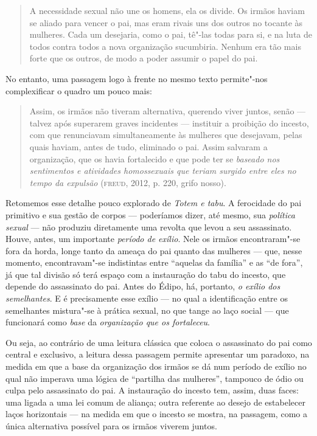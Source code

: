 \begin{quote}
A necessidade sexual não une os homens, ela os divide. Os irmãos haviam
se aliado para vencer o pai, mas eram rivais uns dos outros no tocante
às mulheres. Cada um desejaria, como o pai, tê"-las todas para si, e na
luta de todos contra todos a nova organização sucumbiria. Nenhum era tão
mais forte que os outros, de modo a poder assumir o papel do pai.
\end{quote}

No entanto, uma passagem logo à frente no mesmo texto permite"-nos
complexificar o quadro um pouco mais:

\begin{quote}
Assim, os irmãos não tiveram alternativa, querendo viver juntos, senão
--- talvez após superarem graves incidentes --- instituir a proibição do
incesto, com que renunciavam simultaneamente às mulheres que desejavam,
pelas quais haviam, antes de tudo, eliminado o pai. Assim salvaram a
organização, que os havia fortalecido e que pode ter se \emph{baseado
nos sentimentos e atividades homossexuais que teriam surgido entre eles
no tempo da expulsão} (\textsc{freud}, 2012, p. 220, grifo nosso).
\end{quote}

Retomemos esse detalhe pouco explorado de \emph{Totem e tabu}. A ferocidade
do pai primitivo e sua gestão de corpos --- poderíamos dizer, até mesmo,
sua \emph{política sexual} --- não produziu diretamente uma revolta que
levou a seu assassinato. Houve, antes, um importante \emph{período de
exílio}. Nele os irmãos encontraram"-se fora da horda, longe tanto da
ameaça do pai quanto das mulheres --- que, nesse momento, encontravam"-se
indistintas entre ``aquelas da família'' e as ``de fora'', já que tal
divisão só terá espaço com a instauração do tabu do incesto, que depende
do assassinato do pai. Antes do Édipo, há, portanto, \emph{o exílio dos
semelhantes}. E é precisamente esse exílio --- no qual a identificação
entre os semelhantes mistura"-se à prática sexual, no que tange ao laço
social --- que funcionará como \emph{base} da \emph{organização que os
fortaleceu}.

Ou seja, ao contrário de uma leitura clássica que coloca o assassinato
do pai como central e exclusivo, a leitura dessa passagem permite
apresentar um paradoxo, na medida em que a base da organização dos
irmãos se dá num período de exílio no qual não imperava uma lógica de
``partilha das mulheres'', tampouco de ódio ou culpa pelo assassinato do
pai. A instauração do incesto tem, assim, duas faces: uma ligada a uma
lei comum de aliança; outra referente ao desejo de estabelecer laços
horizontais --- na medida em que o incesto se mostra, na passagem, como
a única alternativa possível para os irmãos viverem juntos.

